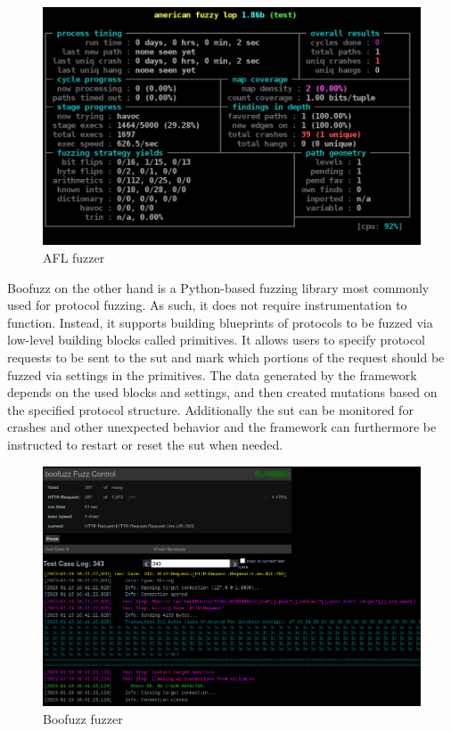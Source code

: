 \begin{figure}
	\centering
	\includegraphics[width=0.7\linewidth]{images/American_fuzzy_lop's_afl-fuzz_running_on_a_test_program}
	\caption{AFL fuzzer}
	\label{fig:americanfuzzylopsafl-fuzzrunningonatestprogram}
\end{figure}

Boofuzz on the other hand is a Python-based fuzzing library most commonly used for protocol fuzzing. As such, it does not require instrumentation to function. Instead, it supports building blueprints of protocols to be fuzzed via low-level building blocks called primitives. It allows users to specify protocol requests to be sent to the \ac{sut} and mark which portions of the request should be fuzzed via settings in the primitives. The data generated by the framework depends on the used blocks and settings, and then created mutations based on the specified protocol structure. Additionally the \ac{sut} can be monitored for crashes and other unexpected behavior and the framework can furthermore be instructed to restart or reset the \ac{sut} when needed.

\begin{figure}
	\centering
	\includegraphics[width=0.7\linewidth]{images/boofuzz_control_center}
	\caption{Boofuzz fuzzer}
	\label{fig:boofuzzcontrolcenter}
\end{figure}

